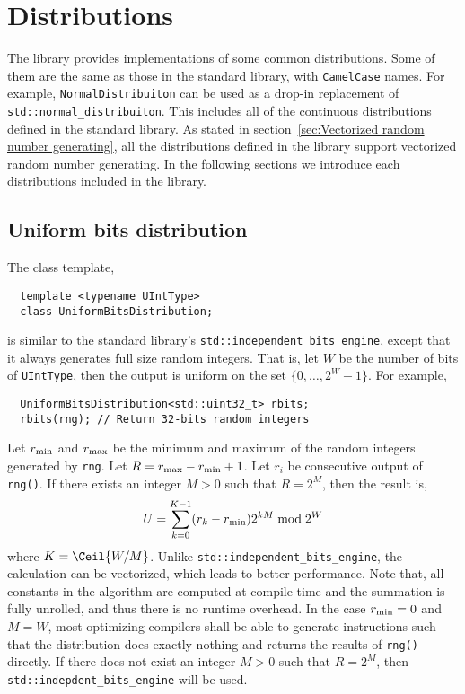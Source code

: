 \section{Distributions}
\label{sec:Distributions}

The library provides implementations of some common distributions. Some of them
are the same as those in the standard library, with \verb|CamelCase| names. For
example, \verb|NormalDistribuiton| can be used as a drop-in replacement of
\verb|std::normal_distribuiton|. This includes all of the continuous
distributions defined in the standard library. As stated in
section~\ref{sec:Vectorized random number generating}, all the distributions
defined in the library support vectorized random number generating. In the
following sections we introduce each distributions included in the library.

\subsection{Uniform bits distribution}
\label{sub:Uniform bits distribution}

The class template,
\begin{Verbatim}
  template <typename UIntType>
  class UniformBitsDistribution;
\end{Verbatim}
is similar to the standard library's \verb|std::independent_bits_engine|,
except that it always generates full size random integers. That is, let $W$ be
the number of bits of \verb|UIntType|, then the output is uniform on the set
$\{0,\dots,2^W - 1\}$. For example,
\begin{Verbatim}
  UniformBitsDistribution<std::uint32_t> rbits;
  rbits(rng); // Return 32-bits random integers
\end{Verbatim}
Let $r_{\mathrm{min}}$ and $r_{\mathrm{max}}$ be the minimum and maximum of the random integers
generated by \verb|rng|. Let $R = r_{\mathrm{max}} - r_{\mathrm{min}} + 1$. Let $r_i$ be consecutive
output of \verb|rng()|. If there exists an integer $M > 0$ such that $R = 2^M$,
then the result is,
\begin{equation*}
  U = \sum_{k = 0}^{K - 1} (r_k - r_{\mathrm{min}}) 2^{kM} \bmod 2^W
\end{equation*}
where $K = \Ceil{W / M}$. Unlike \verb|std::independent_bits_engine|, the
calculation can be vectorized, which leads to better performance. Note that,
all constants in the algorithm are computed at compile-time and the summation
is fully unrolled, and thus there is no runtime overhead. In the case $r_{\mathrm{min}} =
0$ and $M = W$, most optimizing compilers shall be able to generate
instructions such that the distribution does exactly nothing and returns the
results of \verb|rng()| directly. If there does not exist an integer $M > 0$
such that $R = 2^M$, then \verb|std::indepdent_bits_engine| will be used.

